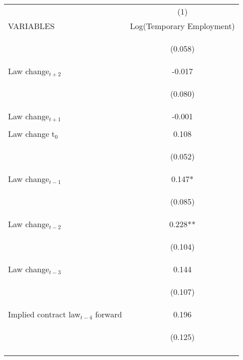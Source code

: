 \begin{center}
\begin{tabular}{lc} \hline
 & (1) \\
VARIABLES & Log(Temporary Employment) \\ \hline
\vspace{4pt} & \begin{footnotesize}(0.058)\end{footnotesize} \\
Law change$_{t+2}$ & -0.017 \\
\vspace{4pt} & \begin{footnotesize}(0.080)\end{footnotesize} \\
Law change$_{t+1}$ & -0.001 \\
\vspace{4pt} & \begin{footnotesize}\end{footnotesize} \\
Law change t$_{0}$ & 0.108 \\
\vspace{4pt} & \begin{footnotesize}(0.052)\end{footnotesize} \\
Law change$_{t-1}$ & 0.147* \\
\vspace{4pt} & \begin{footnotesize}(0.085)\end{footnotesize} \\
Law change$_{t-2}$ & 0.228** \\
\vspace{4pt} & \begin{footnotesize}(0.104)\end{footnotesize} \\
Law change$_{t-3}$ & 0.144 \\
\vspace{4pt} & \begin{footnotesize}(0.107)\end{footnotesize} \\
Implied contract law$_{t-4}$ forward & 0.196 \\
 & \begin{footnotesize}(0.125)\end{footnotesize} \\
\vspace{4pt} & \begin{footnotesize}\end{footnotesize} \\

\end{tabular}
\end{center}
